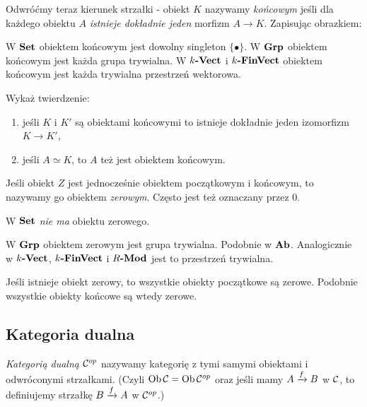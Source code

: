 \begin{defn}
	Odwróćmy teraz kierunek strzałki - obiekt $K$ nazywamy \emph{końcowym} jeśli dla każdego obiektu $A$ \emph{istnieje dokładnie jeden} morfizm $A\to K$. Zapisując obrazkiem: 
\end{defn}

\begin{exmp}
  W $\Set$ obiektem końcowym jest dowolny singleton $\{\bullet\}$. W $\Grp$ obiektem końcowym jest każda grupa trywialna. W $\Vect k$ i $\FinVect k$ obiektem końcowym jest każda trywialna przestrzeń wektorowa.
\end{exmp}

\begin{exc}
  Wykaż twierdzenie:
  \begin{enumerate}
    \item jeśli $K$ i $K'$ są obiektami końcowymi to istnieje dokładnie jeden izomorfizm $K\to K'$,
    \item jeśli $A\simeq K$, to $A$ też jest obiektem końcowym.
  \end{enumerate}
\end{exc}

\begin{defn}
  Jeśli obiekt $Z$ jest jednocześnie obiektem początkowym i końcowym, to nazywamy go obiektem \emph{zerowym}. Często jest też oznaczany przez 0.
\end{defn}

\begin{exmp}
  W $\Set$ \emph{nie ma} obiektu zerowego.
\end{exmp}

\begin{exmp}
  W $\Grp$ obiektem zerowym jest grupa trywialna. Podobnie w $\Ab$. Analogicznie w $\Vect k$, $\FinVect k$ i $\Mod R$ jest to przestrzeń trywialna.
\end{exmp}

\begin{exc}
  Jeśli istnieje obiekt zerowy, to wszystkie obiekty początkowe są zerowe. Podobnie wszystkie obiekty końcowe są wtedy zerowe.
\end{exc}

\subsection{Kategoria dualna}
\begin{defn}
  \emph{Kategorią dualną} $\op \C$ nazywamy kategorię z tymi samymi obiektami i odwróconymi strzałkami. (Czyli $\Ob \C = \Ob {\op \C}$ oraz jeśli mamy $\morpharr fAB$ w $\C$, to definiujemy strzałkę $\morpharr fBA$ w $\op \C$.)
\end{defn}

